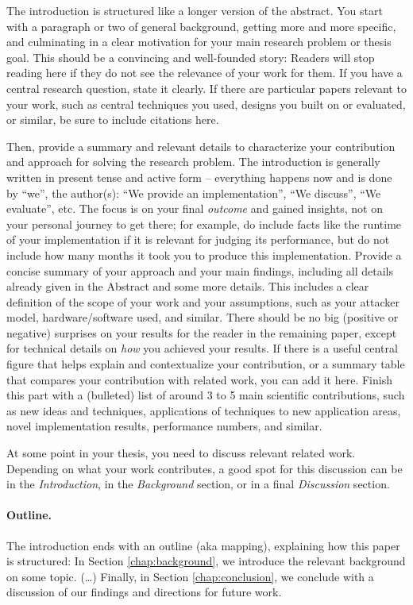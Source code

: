 \documentclass[11pt,
  titlepage=false,
]{scrreprt}
\begin{document}
The introduction is structured like a longer version of the abstract.
You start with a paragraph or two of general background, getting more and more specific, and culminating in a clear motivation for your main research problem or thesis goal.
This should be a convincing and well-founded story: Readers will stop reading here if they do not see the relevance of your work for them.
If you have a central research question, state it clearly.
If there are particular papers relevant to your work, such as central techniques you used, designs you built on or evaluated, or similar, be sure to include citations here.

Then, provide a summary and relevant details to characterize your contribution and approach for solving the research problem.
The introduction is generally written in present tense and active form -- everything happens now and is done by ``we'', the author(s):
``We provide an implementation'', ``We discuss'', ``We evaluate'', etc.
The focus is on your final \emph{outcome} and gained insights, not on your personal journey to get there; for example, do include facts like the runtime of your implementation if it is relevant for judging its performance, but do not include how many months it took you to produce this implementation.
Provide a concise summary of your approach and your main findings, including all details already given in the Abstract and some more details.
This includes a clear definition of the scope of your work and your assumptions, such as your attacker model, hardware/software used, and similar.
There should be no big (positive or negative) surprises on your results for the reader in the remaining paper, except for technical details on \emph{how} you achieved your results.
If there is a useful central figure that helps explain and contextualize your contribution, or a summary table that compares your contribution with related work, you can add it here.
Finish this part with a (bulleted) list of around 3 to 5 main scientific contributions, such as new ideas and techniques, applications of techniques to new application areas, novel implementation results, performance numbers, and similar.

At some point in your thesis, you need to discuss relevant related work.
Depending on what your work contributes, a good spot for this discussion can be in the \emph{Introduction}, in the \emph{Background} section, or in a final \emph{Discussion} section.

\paragraph{Outline.}
The introduction ends with an outline (aka mapping), explaining how this paper is structured:
In Section \ref{chap:background}, we introduce the relevant background on some topic.
(\dots)
Finally, in Section \ref{chap:conclusion}, we conclude with a discussion of our findings and directions for future work.
\end{document}
